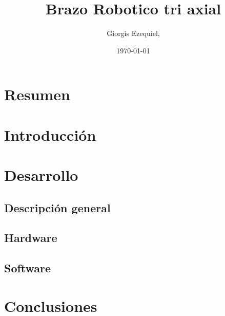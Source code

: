 
\usepackage{amsmath}
\usepackage[nottoc,numbib]{tocbibind}

\title{Brazo Robotico tri axial}
\author{Giorgis Ezequiel,}
\date{\today}

  \maketitle
  \tableofcontents
  \newpage
  \setlength{\jot}{10pt}

  \section{Resumen} %
  \section{Introducción} %
  \section{Desarrollo}
  \subsection{Descripción general} %
  \subsection{Hardware} %
  \subsection{Software}
  \section{Conclusiones}

  \nocite{atmega328Datasheet}
  \nocite{bjarneC++}
  \nocite{deitel}
  \nocite{make}
  {}
  



